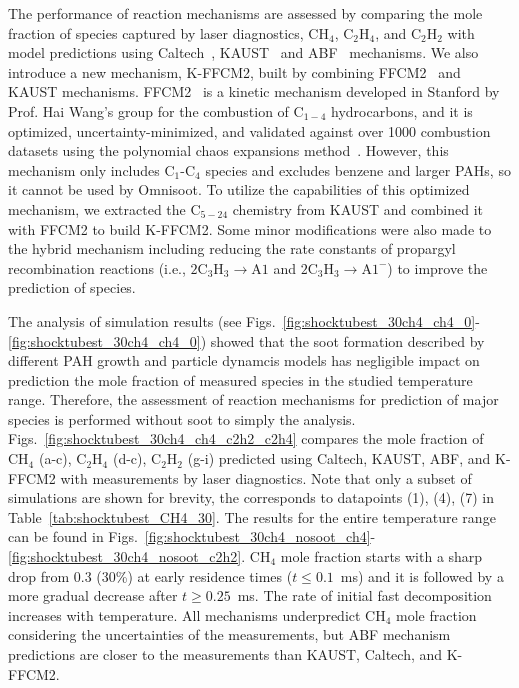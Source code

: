 The performance of reaction mechanisms are assessed by comparing the mole fraction of species captured by laser diagnostics, $\mathrm{CH_4}$, $\mathrm{C_2H_4}$, and $\mathrm{C_2H_2}$ with model predictions using Caltech~\citep{blanquart2009chemical}, KAUST~\cite{wang2013pah} and ABF~\citep{appel2000kinetic} mechanisms. We also introduce a new mechanism, K-FFCM2, built by combining FFCM2~\cite{ZDV2023} and KAUST mechanisms. FFCM2~\cite{ZDV2023} is a kinetic mechanism developed in Stanford by Prof. Hai Wang's group for the combustion of $\mathrm{C_{1-4}}$ hydrocarbons, and it is optimized, uncertainty-minimized, and validated against over 1000 combustion datasets using the polynomial chaos expansions method~\citep{sheen2011method}. However, this mechanism only includes $\mathrm{C_1}$-$\mathrm{C_4}$ species and excludes benzene and larger PAHs, so it cannot be used by Omnisoot. To  utilize the capabilities of this optimized mechanism, we extracted the $\mathrm{C_{5-24}}$ chemistry from KAUST and combined it with FFCM2 to build K-FFCM2. Some minor modifications were also made to the hybrid mechanism including reducing the rate constants of propargyl recombination reactions (i.e., $2\mathrm{C_3H_3}\rightarrow \mathrm{A1}$ and $2\mathrm{C_3H_3}\rightarrow \mathrm{A1^-}$) to improve the prediction of species.   

The analysis of simulation results (see Figs.~\ref{fig:shocktubest_30ch4_ch4_0}-\ref{fig:shocktubest_30ch4_ch4_0}) showed that the soot formation described by different PAH growth and particle dynamcis models has negligible impact on prediction the mole fraction of measured species in the studied temperature range. Therefore, the assessment of reaction mechanisms for prediction of major species is performed without soot to simply the analysis. Figs.~\ref{fig:shocktubest_30ch4_ch4_c2h2_c2h4} compares the mole fraction of $\mathrm{CH_4}$ (a-c), $\mathrm{C_2H_4}$ (d-c), $\mathrm{C_2H_2}$ (g-i) predicted using Caltech, KAUST, ABF, and K-FFCM2 with measurements by laser diagnostics. Note that only a subset of simulations are shown for brevity, the corresponds to datapoints (1), (4), (7) in Table~\ref{tab:shocktubest_CH4_30}. The results for the entire temperature range can be found in Figs.~\ref{fig:shocktubest_30ch4_nosoot_ch4}-\ref{fig:shocktubest_30ch4_nosoot_c2h2}. $\mathrm{CH_4}$ mole fraction starts with a sharp drop from 0.3 (30\%) at early residence times ($t\le0.1$~ms) and it is followed by a more gradual decrease after $t\ge0.25$~ms. The rate of initial fast decomposition increases with temperature. All mechanisms underpredict $\mathrm{CH_4}$ mole fraction considering the uncertainties of  the measurements, but ABF mechanism predictions are closer to the measurements than KAUST, Caltech, and K-FFCM2.

